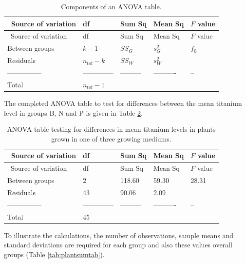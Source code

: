 \documentclass[
  oneside]{krantz}
\begin{document}
\begin{longtable}[]{@{}lllll@{}}
\caption{\label{tab:anovatab} Components of an ANOVA table.}\tabularnewline
\toprule
~Source of variation & df & Sum Sq & Mean Sq & \(F\) value\tabularnewline
\midrule
\endfirsthead
\toprule
~Source of variation & df & Sum Sq & Mean Sq & \(F\) value\tabularnewline
\midrule
\endhead
Between groups & \(k-1\) & \(SS_G\) & \(s_G^2\) & \(f_0\)\tabularnewline
Residuals & \(n_{tot}-k\) & \(SS_W\) & \(s_W^2\) &\tabularnewline
--------------- & -------------- & --------- & ---------- & --\tabularnewline
Total & \(n_{tot}-1\) & & &\tabularnewline
\bottomrule
\end{longtable}

The completed ANOVA table to test for differences between the mean titanium level in groups B, N and P is given in Table \ref{tab:anovatitanium}.

\begin{longtable}[]{@{}lllll@{}}
\caption{\label{tab:anovatitanium} ANOVA table testing for differences in mean titanium levels in plants grown in one of three growing mediums.}\tabularnewline
\toprule
~Source of variation & df & Sum Sq & Mean Sq & \(F\) value\tabularnewline
\midrule
\endfirsthead
\toprule
~Source of variation & df & Sum Sq & Mean Sq & \(F\) value\tabularnewline
\midrule
\endhead
Between groups & 2 & 118.60 & 59.30 & 28.31\tabularnewline
Residuals & 43 & 90.06 & 2.09 &\tabularnewline
--------------- & -------------- & --------- & ---------- & --\tabularnewline
Total & 45 & & &\tabularnewline
\bottomrule
\end{longtable}

To illustrate the calculations, the number of observations, sample means and standard deviations are required for each group and also these values overall groups (Table \ref{tab:plantsumtab}).
\end{document}
